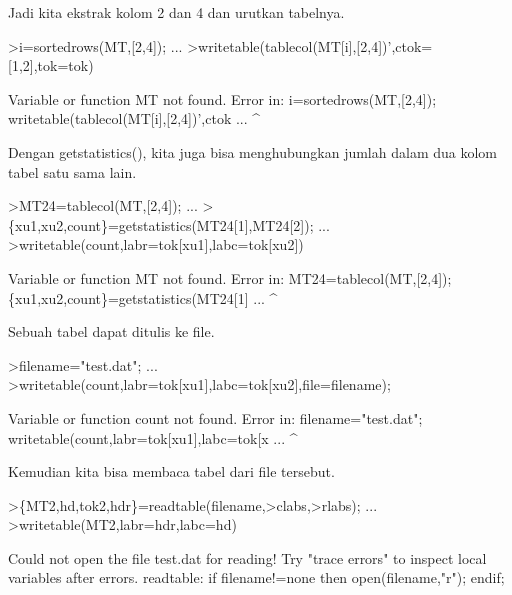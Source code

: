 \documentclass[a4paper,10pt]{article}
\begin{document}
\begin{eulernotebook}
\begin{eulercomment}
\begin{eulercomment}
\begin{eulercomment}
\begin{eulercomment}
\begin{eulercomment}
\begin{eulercomment}
\begin{eulercomment}
\begin{eulercomment}
\begin{eulercomment}
\begin{eulercomment}
\begin{eulercomment}
\begin{eulercomment}
\begin{eulercomment}
\begin{eulercomment}
\begin{eulercomment}
\begin{eulercomment}
\begin{eulercomment}
\begin{eulercomment}
\begin{eulercomment}
Jadi kita ekstrak kolom 2 dan 4 dan urutkan tabelnya.
\end{eulercomment}
\begin{eulerprompt}
>i=sortedrows(MT,[2,4]); ...
>writetable(tablecol(MT[i],[2,4])',ctok=[1,2],tok=tok)
\end{eulerprompt}
\begin{euleroutput}
  Variable or function MT not found.
  Error in:
  i=sortedrows(MT,[2,4]); writetable(tablecol(MT[i],[2,4])',ctok ...
                 ^
\end{euleroutput}
\begin{eulercomment}
Dengan getstatistics(), kita juga bisa menghubungkan jumlah dalam dua
kolom tabel satu sama lain.
\end{eulercomment}
\begin{eulerprompt}
>MT24=tablecol(MT,[2,4]); ...
>\{xu1,xu2,count\}=getstatistics(MT24[1],MT24[2]); ...
>writetable(count,labr=tok[xu1],labc=tok[xu2])
\end{eulerprompt}
\begin{euleroutput}
  Variable or function MT not found.
  Error in:
  MT24=tablecol(MT,[2,4]); \{xu1,xu2,count\}=getstatistics(MT24[1] ...
                  ^
\end{euleroutput}
\begin{eulercomment}
Sebuah tabel dapat ditulis ke file.
\end{eulercomment}
\begin{eulerprompt}
>filename="test.dat"; ...
>writetable(count,labr=tok[xu1],labc=tok[xu2],file=filename);
\end{eulerprompt}
\begin{euleroutput}
  Variable or function count not found.
  Error in:
  filename="test.dat"; writetable(count,labr=tok[xu1],labc=tok[x ...
                                       ^
\end{euleroutput}
\begin{eulercomment}
Kemudian kita bisa membaca tabel dari file tersebut.
\end{eulercomment}
\begin{eulerprompt}
>\{MT2,hd,tok2,hdr\}=readtable(filename,>clabs,>rlabs); ...
>writetable(MT2,labr=hdr,labc=hd)
\end{eulerprompt}
\begin{euleroutput}
  Could not open the file
  test.dat
  for reading!
  Try "trace errors" to inspect local variables after errors.
  readtable:
      if filename!=none then open(filename,"r"); endif;

\end{euleroutput}
\end{eulercomment}
\end{eulercomment}
\end{eulercomment}
\end{eulercomment}
\end{eulercomment}
\end{eulercomment}
\end{eulercomment}
\end{eulercomment}
\end{eulercomment}
\end{eulercomment}
\end{eulercomment}
\end{eulercomment}
\end{eulercomment}
\end{eulercomment}
\end{eulercomment}
\end{eulercomment}
\end{eulercomment}
\end{eulercomment}
\end{eulernotebook}
\end{document}

